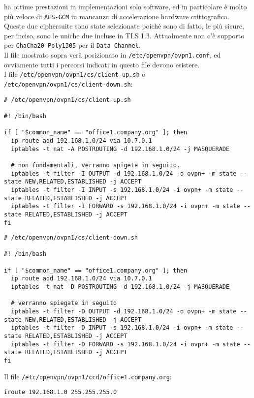 ha ottime prestazioni in implementazioni solo software, ed in particolare è molto
più veloce di \texttt{AES-GCM} in mancanza di accelerazione hardware crittografica.
Queste due ciphersuite sono state selezionate poiché sono di fatto, le più sicure,
per inciso, sono le uniche due incluse in TLS 1.3. Attualmente non c'è supporto
per \texttt{ChaCha20-Poly1305} per il \texttt{Data Channel}.\\
Il file mostrato sopra verà posizionato in \texttt{/etc/openvpn/ovpn1.conf}, ed
ovviamente tutti i percorsi indicati in questo file devono esistere.\\
I file \texttt{/etc/openvpn/ovpn1/cs/client-up.sh} e \\
\texttt{/etc/openvpn/ovpn1/cs/client-down.sh}:
\begin{verbatim}
# /etc/openvpn/ovpn1/cs/client-up.sh

#! /bin/bash

if [ "$common_name" == "office1.company.org" ]; then
  ip route add 192.168.1.0/24 via 10.7.0.1
  iptables -t nat -A POSTROUTING -d 192.168.1.0/24 -j MASQUERADE

  # non fondamentali, verranno spigete in seguito.
  iptables -t filter -I OUTPUT -d 192.168.1.0/24 -o ovpn+ -m state --state NEW,RELATED,ESTABLISHED -j ACCEPT
  iptables -t filter -I INPUT -s 192.168.1.0/24 -i ovpn+ -m state --state RELATED,ESTABLISHED -j ACCEPT
  iptables -t filter -I FORWARD -s 192.168.1.0/24 -i ovpn+ -m state --state RELATED,ESTABLISHED -j ACCEPT
fi
\end{verbatim}

\begin{verbatim}
# /etc/openvpn/ovpn1/cs/client-down.sh

#! /bin/bash

if [ "$common_name" == "office1.company.org" ]; then
  ip route add 192.168.1.0/24 via 10.7.0.1
  iptables -t nat -D POSTROUTING -d 192.168.1.0/24 -j MASQUERADE

  # verranno spiegate in seguito
  iptables -t filter -D OUTPUT -d 192.168.1.0/24 -o ovpn+ -m state --state NEW,RELATED,ESTABLISHED -j ACCEPT
  iptables -t filter -D INPUT -s 192.168.1.0/24 -i ovpn+ -m state --state RELATED,ESTABLISHED -j ACCEPT
  iptables -t filter -D FORWARD -s 192.168.1.0/24 -i ovpn+ -m state --state RELATED,ESTABLISHED -j ACCEPT
fi
\end{verbatim}
Il file \texttt{/etc/openvpn/ovpn1/ccd/office1.company.org}:
\begin{verbatim}
iroute 192.168.1.0 255.255.255.0
\end{verbatim}

